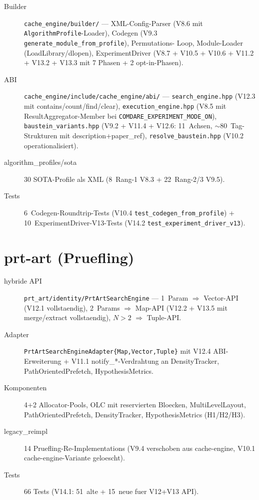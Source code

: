 \begin{description}
    \item[Builder] \texttt{cache\_engine/builder/} — XML-Config-Parser
          (V8.6 mit \texttt{AlgorithmProfile}-Loader), Codegen
          (V9.3 \texttt{generate\_module\_from\_profile}), Permutations-
          Loop, Module-Loader (LoadLibrary/dlopen), ExperimentDriver
          (V8.7 + V10.5 + V10.6 + V11.2 + V13.2 + V13.3 mit
          7 Phasen + 2 opt-in-Phasen).
    \item[ABI] \texttt{cache\_engine/include/cache\_engine/abi/} —
          \texttt{search\_engine.hpp} (V12.3 mit contains/count/find/clear),
          \texttt{execution\_engine.hpp} (V8.5 mit ResultAggregator-Member
          bei \texttt{COMDARE\_EXPERIMENT\_MODE\_ON}),
          \texttt{baustein\_variants.hpp} (V9.2 + V11.4 + V12.6: 11~Achsen,
          $\sim$80~Tag-Strukturen mit description+paper\_ref),
          \texttt{resolve\_baustein.hpp} (V10.2 operationalisiert).
    \item[algorithm\_profiles/sota] 30 SOTA-Profile als XML
          (8~Rang-1 V8.3 + 22~Rang-2/3 V9.5).
    \item[Tests] 6~Codegen-Roundtrip-Tests (V10.4 \texttt{test\_codegen\_from\_profile})
          + 10~ExperimentDriver-V13-Tests (V14.2
          \texttt{test\_experiment\_driver\_v13}).
\end{description}

\section{prt-art (Pruefling)}

\begin{description}
    \item[hybride API] \texttt{prt\_art/identity/PrtArtSearchEngine} —
          1~Param $\Rightarrow$ Vector-API (V12.1 vollstaendig), 2~Params
          $\Rightarrow$ Map-API (V12.2 + V13.5 mit merge/extract
          vollstaendig), $N>2$ $\Rightarrow$ Tuple-API.
    \item[Adapter] \texttt{PrtArtSearchEngineAdapter\{Map,Vector,Tuple\}}
          mit V12.4 ABI-Erweiterung + V11.1 notify\_*-Verdrahtung an
          DensityTracker, PathOrientedPrefetch, HypothesisMetrics.
    \item[Komponenten] 4+2 Allocator-Pools, OLC mit reservierten Bloecken,
          MultiLevelLayout, PathOrientedPrefetch, DensityTracker,
          HypothesisMetrics (H1/H2/H3).
    \item[legacy\_reimpl] 14 Pruefling-Re-Implementations
          (V9.4 verschoben aus cache-engine, V10.1 cache-engine-Variante geloescht).
    \item[Tests] 66 Tests (V14.1: 51~alte + 15~neue fuer V12+V13 API).
\end{description}


